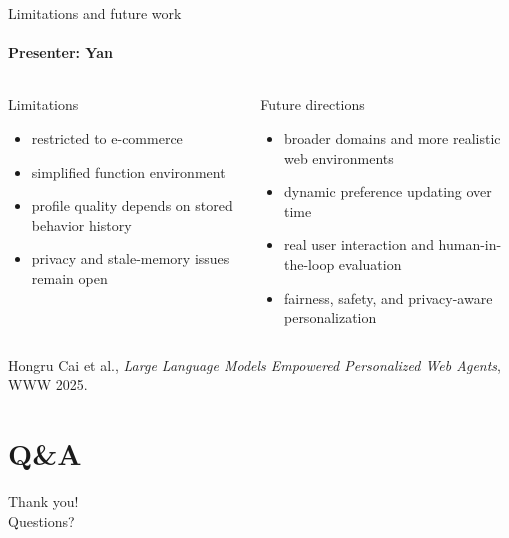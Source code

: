 \documentclass[10pt]{beamer}
\newcommand{\speaker}[1]{\framesubtitle{Presenter: #1}}
\begin{document}
\begin{frame}{Limitations and future work}
  \speaker{Yan}
  \begin{columns}[T,onlytextwidth]
      \begin{block}{Limitations}
        \small
        \begin{itemize}
          \item restricted to e-commerce
          \item simplified function environment
          \item profile quality depends on stored behavior history
          \item privacy and stale-memory issues remain open
        \end{itemize}
      \end{block}
      \begin{block}{Future directions}
        \small
        \begin{itemize}
          \item broader domains and more realistic web environments
          \item dynamic preference updating over time
          \item real user interaction and human-in-the-loop evaluation
          \item fairness, safety, and privacy-aware personalization
        \end{itemize}
      \end{block}
  \end{columns}
  \vspace{0.3em}
  \centering
  {\small Hongru Cai et al., \textit{Large Language Models Empowered Personalized Web Agents}, WWW 2025.}
\end{frame}

\section*{Q\&A}

\begin{frame}[plain]
  \vfill
  \centering
  {\Huge\textcolor{uOttawaPrimary}{Thank you!}}\\[0.6em]
  {\large Questions?}\\[1em]
  \vfill
\end{frame}
\end{document}
